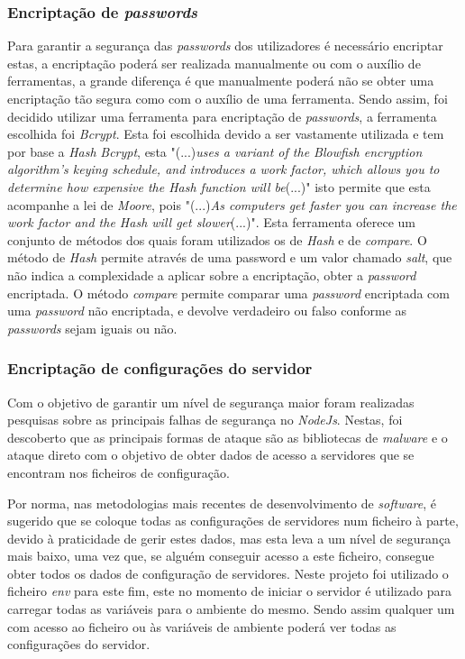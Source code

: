 \subsubsection{Encriptação de \textit{passwords}}
Para garantir a segurança das \textit{passwords} dos utilizadores é necessário encriptar estas, a encriptação poderá ser realizada manualmente ou com o auxílio de ferramentas, a grande diferença é que manualmente poderá não se obter uma encriptação tão segura como com o auxílio de uma ferramenta. Sendo assim, foi decidido utilizar uma ferramenta para encriptação de \textit{passwords}, a ferramenta escolhida foi \textit{Bcrypt}. Esta foi escolhida devido a ser vastamente utilizada e tem por base a \emph{Hash} \textit{Bcrypt}, esta "(...)\emph{uses a variant of the Blowfish encryption algorithm’s keying schedule, and introduces a work factor, which allows you to determine how expensive the Hash function will be}(...)"\citep{Bcrypt} isto permite que esta acompanhe a lei de \emph{Moore}, pois "(...)\emph{As computers get faster you can increase the work factor and the Hash will get slower}(...)"\citep{Bcrypt}. Esta ferramenta oferece um conjunto de métodos dos quais foram utilizados os de \emph{Hash} e de \emph{compare}. O método de \emph{Hash} permite através de uma password e um valor chamado \textit{salt}, que não indica a complexidade a aplicar sobre a encriptação, obter a \textit{password} encriptada. O método \emph{compare} permite comparar uma \textit{password} encriptada com uma \textit{password} não encriptada, e devolve verdadeiro ou falso conforme as \textit{passwords} sejam iguais ou não.

\subsubsection{Encriptação de configurações do servidor}
Com o objetivo de garantir um nível de segurança maior foram realizadas pesquisas sobre as principais falhas de segurança no \textit{NodeJs}. Nestas, foi descoberto que as principais formas de ataque são as bibliotecas de \textit{malware} e o ataque direto com o objetivo de obter dados de acesso a servidores que se encontram nos ficheiros de configuração.

Por norma, nas metodologias mais recentes de desenvolvimento de \emph{software}, é sugerido que se coloque todas as configurações de servidores num ficheiro à parte, devido à praticidade de gerir estes dados, mas esta leva a um nível de segurança mais baixo, uma vez que, se alguém conseguir acesso a este ficheiro, consegue obter todos os dados de configuração de servidores. Neste projeto foi utilizado o ficheiro \textit{env} para este fim, este no momento de iniciar o servidor é utilizado para carregar todas as variáveis para o ambiente do mesmo. Sendo assim qualquer um com acesso ao ficheiro ou às variáveis de ambiente poderá ver todas as configurações do servidor.

